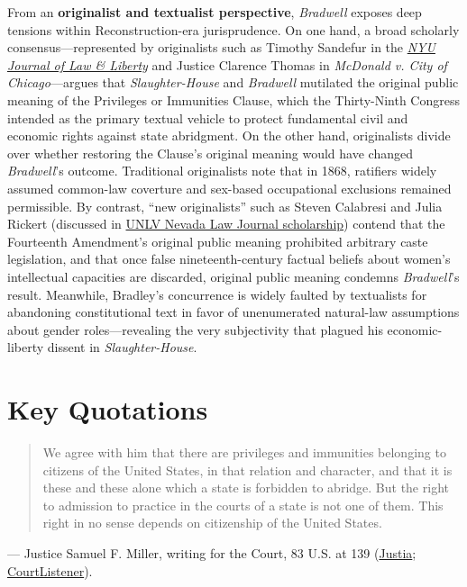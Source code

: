 \documentclass[12pt]{article}
\begin{document}
From an \textbf{originalist and textualist perspective}, \textit{Bradwell} exposes deep tensions within Reconstruction-era jurisprudence. On one hand, a broad scholarly consensus---represented by originalists such as Timothy Sandefur in the \href{https://www.law.nyu.edu/sites/default/files/ECM_PRO_065902.pdf}{\textit{NYU Journal of Law \& Liberty}} and Justice Clarence Thomas in \textit{McDonald v. City of Chicago}---argues that \textit{Slaughter-House} and \textit{Bradwell} mutilated the original public meaning of the Privileges or Immunities Clause, which the Thirty-Ninth Congress intended as the primary textual vehicle to protect fundamental civil and economic rights against state abridgment. On the other hand, originalists divide over whether restoring the Clause's original meaning would have changed \textit{Bradwell}'s outcome. Traditional originalists note that in 1868, ratifiers widely assumed common-law coverture and sex-based occupational exclusions remained permissible. By contrast, ``new originalists'' such as Steven Calabresi and Julia Rickert (discussed in \href{https://scholars.law.unlv.edu/cgi/viewcontent.cgi?article=1715&context=nlj}{UNLV Nevada Law Journal scholarship}) contend that the Fourteenth Amendment's original public meaning prohibited arbitrary caste legislation, and that once false nineteenth-century factual beliefs about women's intellectual capacities are discarded, original public meaning condemns \textit{Bradwell}'s result. Meanwhile, Bradley's concurrence is widely faulted by textualists for abandoning constitutional text in favor of unenumerated natural-law assumptions about gender roles---revealing the very subjectivity that plagued his economic-liberty dissent in \textit{Slaughter-House}.

\section{Key Quotations}

\begin{quote}
We agree with him that there are privileges and immunities belonging to citizens of the United States, in that relation and character, and that it is these and these alone which a state is forbidden to abridge. But the right to admission to practice in the courts of a state is not one of them. This right in no sense depends on citizenship of the United States.
\end{quote}
\noindent --- Justice Samuel F. Miller, writing for the Court, 83 U.S. at 139 (\href{https://supreme.justia.com/cases/federal/us/83/130/}{Justia}; \href{https://www.courtlistener.com/opinion/88662/bradwell-v-state/}{CourtListener}).
\end{document}
